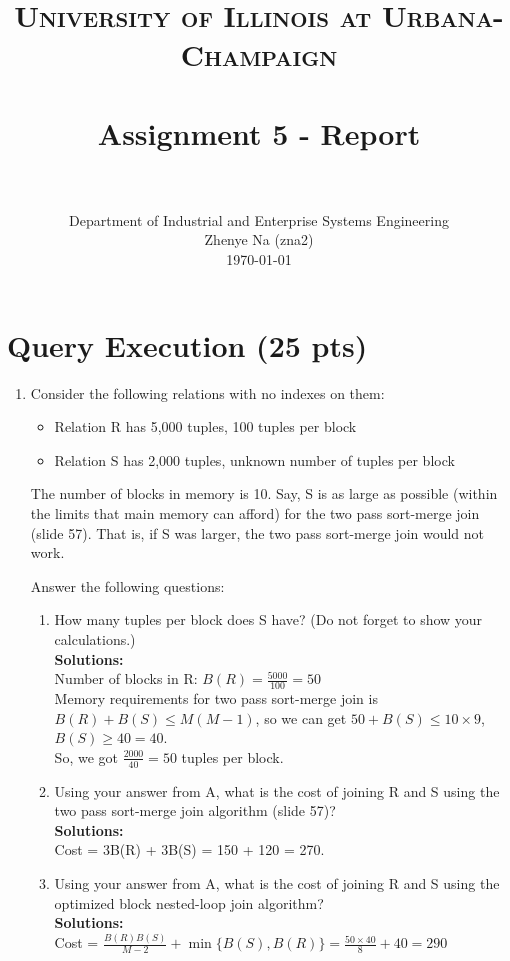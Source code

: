 \documentclass[paper=a4, fontsize=11pt]{scrartcl}
\title{
	\usefont{OT1}{bch}{b}{n}
	\normalfont \normalsize \textsc{University of Illinois at Urbana-Champaign} \\ [25pt]
	\horrule{0.5pt} \\[0.4cm]
	\huge Assignment 5 - Report \\
	\horrule{2pt} \\[0.5cm]
}
\author{
	\normalfont 								\normalsize
	Department of Industrial and Enterprise Systems Engineering\\
	\normalsize Zhenye Na (zna2)\\[-3pt]		\normalsize
	\today
}
\date{}
\numberwithin{equation}{section}		%
\numberwithin{figure}{section}			%
\numberwithin{table}{section}				%
\begin{document}
	\maketitle
	
	\section{Query Execution (25 pts)}
	
	\begin{enumerate}
		\item Consider the following relations with no indexes on them:
		\begin{itemize}
			\item Relation R has 5,000 tuples, 100 tuples per block
			\item Relation S has 2,000 tuples, unknown number of tuples per block 
		\end{itemize}
		
		The number of blocks in memory is 10. Say, S is as large as possible (within the limits that main memory can afford) for the two pass sort-merge join (slide 57). That is, if S was larger, the two pass sort-merge join would not work.
		
		Answer the following questions:
		\begin{enumerate}
			\item How many tuples per block does S have? (Do not forget to show your calculations.)\\
			\textbf{Solutions: }\\
			Number of blocks in R: $B(R) = \frac{5000}{100} = 50$\\
			Memory requirements for two pass sort-merge join is $B(R) + B(S) \leq M(M-1)$, so we can get $50 + B(S) \leq 10 \times 9$, $B(S) \geq 40 = 40$.\\
			So, we got $\frac{2000}{40} = 50$ tuples per block.
			
			\item Using your answer from A, what is the cost of joining R and S using the two pass sort-merge join algorithm (slide 57)?\\
			\textbf{Solutions: }\\
			Cost = 3B(R) + 3B(S) = 150 + 120 = 270.
			
			\item Using your answer from A, what is the cost of joining R and S using the optimized block nested-loop join algorithm?\\
			\textbf{Solutions: }\\
			Cost = $\frac{B(R)B(S)}{M-2} + \min \{B(S) ,B(R)\} = \frac{50 \times 40}{8} + 40 = 290$
			

\end{enumerate}
\end{enumerate}
\end{document}
